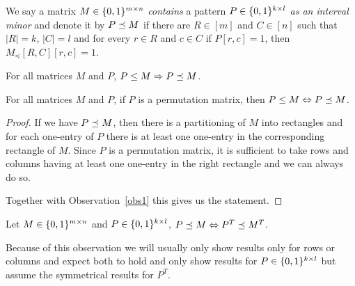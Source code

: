 \begin{defn}
We say a matrix $M\in\{0,1\}^{m\times n}$ \emph{contains} a pattern $P\in\{0,1\}^{k\times l}$ \emph{as an interval minor} and denote it by $P\preceq M$ if there are $R\in[m]$ and $C\in[n]$ such that $|R|=k$, $|C|=l$ and for every $r\in R$ and $c\in C$ if $P[r,c]=1$, then $M_{\preceq}[R,C][r,c]=1$.
\end{defn}
%
%
%
\begin{obs}
\label{obs1}
For all matrices $M$ and $P$, $P\leq M\Rightarrow P\preceq M$.
\end{obs}
\begin{obs}
For all matrices $M$ and $P$, if $P$ is a permutation matrix, then $P\leq M\Leftrightarrow P\preceq M$.
\end{obs}
\begin{proof}
If we have $P\preceq M$, then there is a partitioning of $M$ into rectangles and for each one-entry of $P$ there is at least one one-entry in the corresponding rectangle of $M$. Since $P$ is a permutation matrix, it is sufficient to take rows and columns having at least one one-entry in the right rectangle and we can always do so.

Together with Observation~\ref{obs1} this gives us the statement.
\end{proof}
\begin{obs}
Let $M\in\{0,1\}^{m\times n}$ and $P\in\{0,1\}^{k\times l}$, $P\preceq M\Leftrightarrow P^T\preceq M^T$.
\end{obs}
Because of this observation we will usually only show results only for rows or columns and expect both to hold and only show results for $P\in\{0,1\}^{k\times l}$ but assume the symmetrical results for $P^T$.
